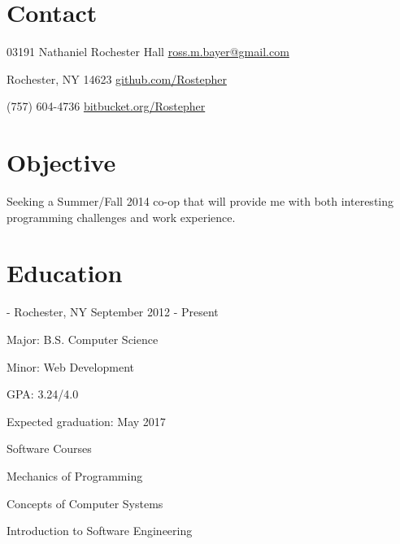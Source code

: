 \documentclass[letterpaper,margin,line,11pt]{resume}
\newcommand{\rdate}[1]{\hfill {\small #1}}
\begin{document}
\begin{resume}

\section{\mysidestyle Contact} 
	\begin{asparablank}
		\item 03191 Nathaniel Rochester Hall \hfill \href{mailto:ross.m.bayer@gmail.com}{ross.m.bayer@gmail.com}
		\item Rochester, NY 14623 \hfill \href{https://github.com/Rostepher}{github.com/Rostepher}
		\item (757) 604-4736 \hfill \href{https://bitbucket.org/Rostepher}{bitbucket.org/Rostepher}
	\end{asparablank}

\section{\mysidestyle Objective}
	Seeking a Summer/Fall 2014 co-op that will provide me with both interesting programming challenges and work experience.

\section{\mysidestyle Education}
	\begin{compactdesc}
		\item[Rochester Institute of Technology] - Rochester, NY \rdate{September 2012 - Present}
		\begin{compactitem} {
			\item Major: B.S. Computer Science
			\item Minor: Web Development
			\item GPA: 3.24/4.0
			\item Expected graduation: May 2017
			\item Software Courses
			\begin{compactitem} { \small
			    \item Mechanics of Programming
			    \item Concepts of Computer Systems
			    \item Introduction to Software Engineering
			} \end{compactitem}
		} \end{compactitem}
	\end{compactdesc}


\end{resume}
\end{document}
